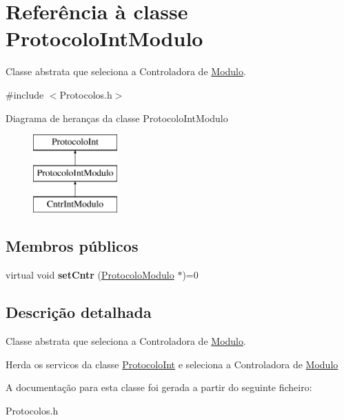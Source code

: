 \hypertarget{class_protocolo_int_modulo}{
\section{\-Referência à classe \-Protocolo\-Int\-Modulo}
\label{class_protocolo_int_modulo}
}


\-Classe abstrata que seleciona a \-Controladora de \hyperlink{class_modulo}{\-Modulo}.  




{\ttfamily \#include $<$\-Protocolos.\-h$>$}

\-Diagrama de heranças da classe \-Protocolo\-Int\-Modulo\begin{figure}[H]
\begin{center}
\leavevmode
\includegraphics[height=3.000000cm]{class_protocolo_int_modulo}
\end{center}
\end{figure}
\subsection*{\-Membros públicos}
\begin{DoxyCompactItemize}
\item 
\hypertarget{class_protocolo_int_modulo_a493ea7b6822cac39cd5ae8e31af6fb39}{
virtual void {\bfseries set\-Cntr} (\hyperlink{class_protocolo_modulo}{\-Protocolo\-Modulo} $\ast$)=0}
\label{class_protocolo_int_modulo_a493ea7b6822cac39cd5ae8e31af6fb39}

\end{DoxyCompactItemize}


\subsection{\-Descrição detalhada}
\-Classe abstrata que seleciona a \-Controladora de \hyperlink{class_modulo}{\-Modulo}. 

\-Herda os servicos da classe \hyperlink{class_protocolo_int}{\-Protocolo\-Int} e seleciona a \-Controladora de \hyperlink{class_modulo}{\-Modulo} 

\-A documentação para esta classe foi gerada a partir do seguinte ficheiro\-:\begin{DoxyCompactItemize}
\item 
\-Protocolos.\-h\end{DoxyCompactItemize}
